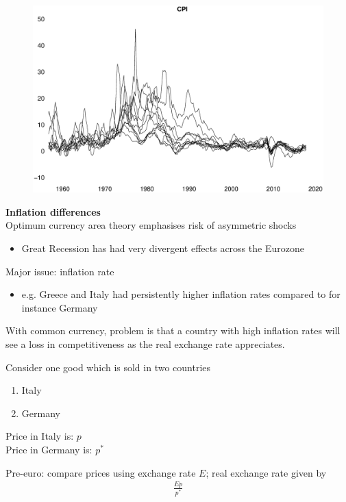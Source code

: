 \documentclass{beamer}
\begin{document}
\begin{frame}
  \begin{figure}
    \includegraphics[scale=.3]{inflation_eurozone.eps}
  \end{figure}
\end{frame}

\begin{frame}
  \textbf{Inflation differences}\\
  Optimum currency area theory emphasises risk of asymmetric shocks
  \begin{itemize}
    \item Great Recession has had very divergent effects across the Eurozone
  \end{itemize}
  \medskip
  Major issue: inflation rate  
  \begin{itemize}
    \item e.g. Greece and Italy had persistently higher inflation rates compared to for instance Germany
  \end{itemize}
  \medskip
  With common currency, problem is that a country with high inflation rates will see a loss in competitiveness as the real exchange rate appreciates. 
\end{frame}

\begin{frame}
  Consider one good which is sold in two countries
  \begin{enumerate}
    \item Italy
    \item Germany
  \end{enumerate}
  Price in Italy is: $p$\\
  Price in Germany is: $p^*$\\
  \medskip
  
  Pre-euro: compare prices using exchange rate $E$; real exchange rate given by
  \begin{align}
    \frac{Ep}{p^*}
  \end{align}  
\end{frame}
\end{document}
